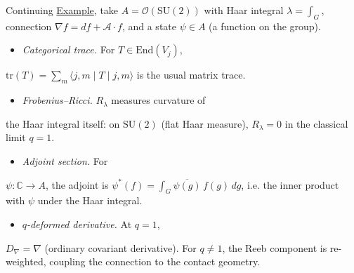 \begin{example}
  \label{ex:categorical-action-notation-su2}
Continuing \hyperref[ex:connection-su2]{Example}, take
$A = \mathcal{O}(\mathrm{SU}(2))$ with Haar integral $\lambda = \int_G$,
connection $\nabla f = df + \mathcal{A} \cdot f$, and a state
$\psi \in A$ (a function on the group).

\begin{itemize}
  \item \emph{Categorical trace.}  For $T \in \mathrm{End}(V_j)$,
\end{itemize}
  $\mathrm{tr}(T) = \sum_m \langle j,m \mid T \mid j,m \rangle$
  is the usual matrix trace.
\begin{itemize}
  \item \emph{Frobenius--Ricci.}  $R_\lambda$ measures curvature of
\end{itemize}
  the Haar integral itself: on $\mathrm{SU}(2)$ (flat Haar measure),
  $R_\lambda = 0$ in the classical limit $q = 1$.
\begin{itemize}
  \item \emph{Adjoint section.}  For
\end{itemize}
  $\psi \colon \mathbb{C} \to A$, the adjoint is
  $\psi^*(f) = \int_G \overline{\psi(g)}\,f(g)\,dg$, i.e. the
  inner product with $\psi$ under the Haar integral.
\begin{itemize}
  \item \emph{$q$-deformed derivative.}  At $q = 1$,
\end{itemize}
  $D_\nabla = \nabla$ (ordinary covariant derivative).  For
  $q \neq 1$, the Reeb component is re-weighted, coupling the
  connection to the contact geometry.
\end{example}

